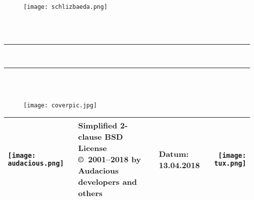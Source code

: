%

\thispagestyle{empty} %
\begin{titlepage}
\vspace*{-3cm}
\begin{figure}[h]
\centering
\texttt{[image: schlizbaeda.png]}
\end{figure}

\begin{center}
\LARGE{\textbf{\Dokumentart}}\\[1.5ex] 
\Large{\Bezeichnung}\\[4ex]
\noindent\rule[1ex]{\textwidth}{3pt} %
\textbf{\titel}\\[1.5ex]             %
\noindent\rule[1ex]{\textwidth}{3pt} 
\\[2ex]

\normalsize
\textbf{\\}
\begin{figure}[h]
\centering
\texttt{[image: coverpic.jpg]}
\end{figure}

\begin{tabular}{lllr}\\
\hline
\parbox[c][50px]{0.10\textwidth}{\texttt{[image: audacious.png]}} & 
\parbox[c]{0.55\textwidth}{Simplified 2-clause BSD License\\ \copyright\ 2001--2018 by Audacious developers and others} &
\parbox[c]{0.15\textwidth}{Datum:\\13.04.2018} &
\parbox[c][50px]{0.10\textwidth}{\texttt{[image: tux.png]}}\\
\hline
\end{tabular}


\end{center}
\end{titlepage}
